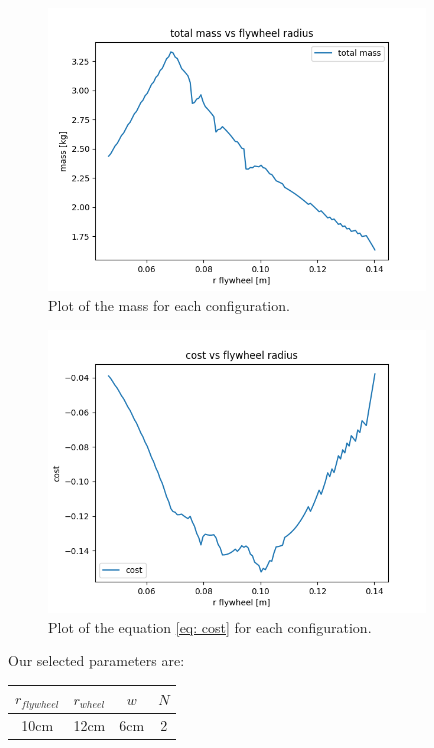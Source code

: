 \begin{figure}[H]
	\centering
	\includegraphics[width=10cm]{img/optimization/mass.png}
	\caption{Plot of the mass for each configuration.}
	\label{fig:Mass plot}
\end{figure}


\begin{figure}[H]
	\centering
	\includegraphics[width=10cm]{img/optimization/cost.png}
	\caption{Plot of the equation \ref{eq: cost} for each configuration.}
	\label{fig:Mass plot}
\end{figure}

Our selected parameters are:
\begin{center}
	\begin{tabular}{ |c|c|c|c| } 
	 \hline
	 $r_{flywheel}$ & $r_{wheel}$ & $w$ & $N$\\
	 \hline 
	 10cm & 12cm & 6cm & 2 \\ 
	 \hline
	\end{tabular}
\end{center}

